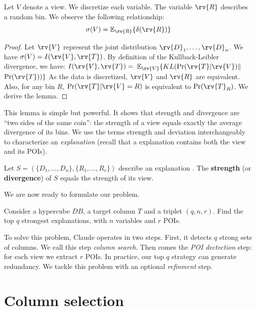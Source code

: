\begin{lemma}
Let $V$ denote a view. We discretize each variable. The variable $\rv{R}$
describes a random bin.  We observe the following relationship:
\[
    \sigma(V) = \mathbb{E}_{\rv{R}} \{ \delta(\rv{R}) \}
\]
\end{lemma}

\begin{proof}
Let $\rv{V}$ represent the joint distribution $\rv{D}_1, \ldots, \rv{D}_n$.
We have $\sigma(V) = I(\rv{V},\rv{T})$.
By definition of the Kullback-Leibler divergence, we have: 
$I(\rv{V},\rv{T}) = $ $\mathbb{E}_{\rv{V}} \{ KL( \Pr(\rv{T} | \rv{V}) \|$ $ \Pr(\rv{T}) ) \}$
As the data is discretized, $\rv{V}$ and $\rv{R}$ are equivalent. Also,
for any bin $R$, $\Pr(\rv{T} | \rv{V} = R)$ is equivalent to
$\Pr(\rv{T}_R)$. We derive the lemma.
\end{proof}


This lemma is simple but powerful. It shows that strength and divergence are
``two sides of the same coin'': the strength of a view equals exactly the
average divergence of its bins. We use the terms strength and
deviation interchangeably to characterize an \emph{explanation} (recall that a
explanation contains both the view and its POIs).

\begin{definition}
Let $S=(\{ D_1, \ldots, D_n\}, \{R_1, \ldots, R_r\})$ describe an explanation . The
\textbf{strength} (or \textbf{divergence}) of $S$ equals the strength
of its view.
\end{definition}

We are now ready to formulate our problem.

\begin{problem}
Consider a hypercube $DB$, a target column $T$ and a triplet $(q, n, r)$. Find
the top $q$ strongest explanations, with $n$ variables and $r$ POIs.
\end{problem}

To solve this problem, Claude operates in two steps. First, it detects $q$
strong sets of columns.  We call this step \emph{column search}.  Then comes
the \emph{POI dectection} step: for each view we extract $r$ POIs. In practice,
our top $q$ strategy can generate redundancy. We tackle this problem with an
optional \emph{refinment} step.

\section{Column selection}
\label{sec:colum}

